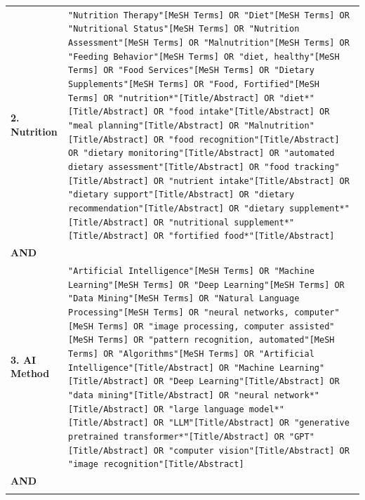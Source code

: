 \begin{longtable}{p{}p{}}
    \textbf{2. Nutrition}        &
    \footnotesize\texttt{"Nutrition Therapy"[MeSH Terms] OR
    "Diet"[MeSH Terms] OR
    "Nutritional Status"[MeSH Terms] OR
    "Nutrition Assessment"[MeSH Terms] OR
    "Malnutrition"[MeSH Terms] OR
    "Feeding Behavior"[MeSH Terms] OR
    "diet, healthy"[MeSH Terms] OR
    "Food Services"[MeSH Terms] OR
    "Dietary Supplements"[MeSH Terms] OR
    "Food, Fortified"[MeSH Terms] OR
    "nutrition*"[Title/Abstract] OR
    "diet*"[Title/Abstract] OR
    "food intake"[Title/Abstract] OR
    "meal planning"[Title/Abstract] OR
    "Malnutrition"[Title/Abstract] OR
    "food recognition"[Title/Abstract] OR
    "dietary monitoring"[Title/Abstract] OR
    "automated dietary assessment"[Title/Abstract] OR
    "food tracking"[Title/Abstract] OR
    "nutrient intake"[Title/Abstract] OR
    "dietary support"[Title/Abstract] OR
    "dietary recommendation"[Title/Abstract] OR
    "dietary supplement*"[Title/Abstract] OR
    "nutritional supplement*"[Title/Abstract] OR
    "fortified food*"[Title/Abstract]}                                                  \\
    \addlinespace

    \textbf{AND}                 &
    \\
    \addlinespace

    \textbf{3. AI Method}        &
    \footnotesize\texttt{"Artificial Intelligence"[MeSH Terms] OR
    "Machine Learning"[MeSH Terms] OR
    "Deep Learning"[MeSH Terms] OR
    "Data Mining"[MeSH Terms] OR
    "Natural Language Processing"[MeSH Terms] OR
    "neural networks, computer"[MeSH Terms] OR
    "image processing, computer assisted"[MeSH Terms] OR
    "pattern recognition, automated"[MeSH Terms] OR
    "Algorithms"[MeSH Terms] OR
    "Artificial Intelligence"[Title/Abstract] OR
    "Machine Learning"[Title/Abstract] OR
    "Deep Learning"[Title/Abstract] OR
    "data mining"[Title/Abstract] OR
    "neural network*"[Title/Abstract] OR
    "large language model*"[Title/Abstract] OR
    "LLM"[Title/Abstract] OR
    "generative pretrained transformer*"[Title/Abstract] OR
    "GPT"[Title/Abstract] OR
    "computer vision"[Title/Abstract] OR
    "image recognition"[Title/Abstract]}                                                \\
    \addlinespace

    \textbf{AND}                 &
    \\
    \addlinespace


\end{longtable}
